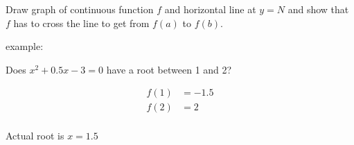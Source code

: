 \documentclass[letterpaper, landscape]{exam}
\begin{document}
  Draw graph of continuous function $f$ and horizontal line at $y = N$ and show that
  $f$ has to cross the line to get from $f(a)$ to $f(b)$.

  example:

  Does $x^2 + 0.5x - 3 = 0$ have a root between 1 and 2?  

  \begin{align*}
    f(1) & = -1.5 \\
    f(2) & = 2 \\
  \end{align*}

  Actual root is $x = 1.5$
\end{document}
